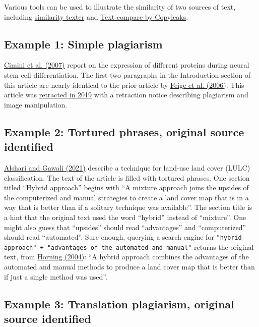 \documentclass[letterpaper, 12pt]{article}
\begin{document}
Various tools can be used to illustrate the similarity of two sources of text, including \href{https://people.f4.htw-berlin.de/~weberwu/simtexter/app.html}{similarity texter} and \href{https://app.copyleaks.com/text-compare}{Text compare by Copyleaks}.

\subsection*{Example 1: Simple plagiarism}

\href{https://doi.org/10.1155/2007/48242}{Cimini et al. (2007)} report on the expression of different proteins during neural stem cell differentiation. The first two paragraphs in the Introduction section of this article are nearly identical to the prior article by \href{https://doi.org/10.1016/j.plipres.2005.12.002}{Feige et al. (2006)}. This article was \href{https://doi.org/10.1155/2019/5656198}{retracted in 2019} with a retraction notice describing plagiarism and image manipulation. 

\subsection*{Example 2: Tortured phrases, original source identified}

\href{https://doi.org/10.1016/j.gltp.2021.01.002}{Alshari and Gawali (2021)} describe a technique for land-use land cover (LULC) classification. The text of the article is filled with tortured phrases. One section titled ``Hybrid approach'' begins with ``A mixture approach joins the upsides of the computerized and manual strategies to create a land cover map that is in a way that is better than if a solitary technique was available''. The section title is a hint that the original text used the word ``hybrid'' instead of ``mixture''. One might also guess that ``upsides'' should read ``advantages'' and ``computerized'' should read ``automated''. Sure enough, querying a search engine for \verb|"hybrid approach" + "advantages of the automated and manual"| returns the original text, from \href{https://www.amnh.org/content/download/74344/1391366/file/land-cover-classification-methods.pdf}{Horning (2004)}: ``A hybrid approach combines the advantages of the automated and manual methods to
produce a land cover map that is better than if just a single method was used''.

\pagebreak

\subsection*{Example 3: Translation plagiarism, original source identified}
\end{document}
